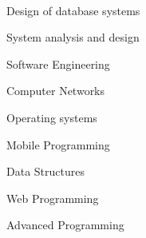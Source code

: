   ‌‌
  \\
  \begin{cvitems}
    \item {Design of database systems}
    \item {System analysis and design}
    \item {Software Engineering}
    \item {Computer Networks}
    \item {Operating systems}
    \item {Mobile Programming}
    \item {Data Structures}
    \item {Web Programming}
    \item {Advanced Programming}
  \end{cvitems}


